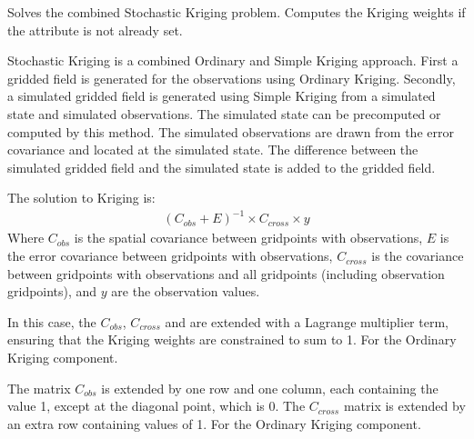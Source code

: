 \documentclass[letterpaper,10pt,english]{sphinxmanual}
\begin{document}
\begin{fulllineitems}

\begin{fulllineitems}
\label{\detokenize{kriging:glomar_gridding.stochastic.StochasticKriging.solve}}
\pysigstartsignatures
\pysiglinewithargsret
{}
{}
{}
\pysigstopsignatures
\sphinxAtStartPar
Solves the combined Stochastic Kriging problem. Computes the Kriging
weights if the  attribute is not already set.

\sphinxAtStartPar
Stochastic Kriging is a combined Ordinary and Simple Kriging approach.
First a gridded field is generated for the observations using Ordinary
Kriging. Secondly, a simulated gridded field is generated using Simple
Kriging from a simulated state and simulated observations. The simulated
state can be pre\sphinxhyphen{}computed or computed by this method. The simulated
observations are drawn from the error covariance and located at the
simulated state. The difference between the simulated gridded field and
the simulated state is added to the gridded field.

\sphinxAtStartPar
The solution to Kriging is:
\begin{equation*}
\begin{split}(C_{obs} + E)^{-1} \times C_{cross} \times y\end{split}
\end{equation*}
\sphinxAtStartPar
Where \(C_{obs}\) is the spatial covariance between grid\sphinxhyphen{}points
with observations, \(E\) is the error covariance between grid\sphinxhyphen{}points
with observations, \(C_{cross}\) is the covariance between
grid\sphinxhyphen{}points with observations and all grid\sphinxhyphen{}points (including observation
grid\sphinxhyphen{}points), and \(y\) are the observation values.

\sphinxAtStartPar
In this case, the \(C_{obs}\), \(C_{cross}\) and are extended
with a Lagrange multiplier term, ensuring that the Kriging weights are
constrained to sum to 1. For the Ordinary Kriging component.

\sphinxAtStartPar
The matrix \(C_{obs}\) is extended by one row and one column, each
containing the value 1, except at the diagonal point, which is 0. The
\(C_{cross}\) matrix is extended by an extra row containing values
of 1. For the Ordinary Kriging component.


\end{fulllineitems}
\end{fulllineitems}
\end{document}
